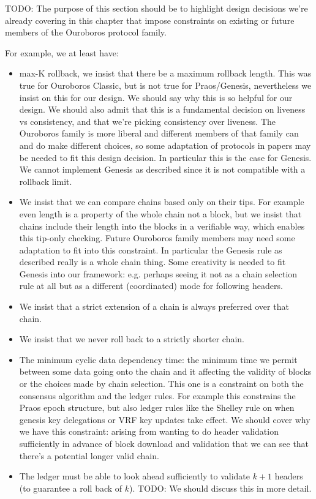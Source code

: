  TODO: The purpose of this section should be to highlight design
decisions we're already covering in this chapter that impose constraints
on existing or future members of the Ouroboros protocol family.

For example, we at least have:
\begin{itemize}
\item max-K rollback, we insist that there be a maximum rollback length. This
was true for Ouroboros Classic, but is not true for Praos/Genesis, nevertheless
we insist on this for our design. We should say why this is so helpful for our
design. We should also admit that this is a fundamental decision on liveness vs
consistency, and that we're picking consistency over liveness. The Ouroboros
family is more liberal and different members of that family can and do make
different choices, so some adaptation of protocols in papers may be needed to
fit this design decision. In particular this is the case for Genesis. We cannot
implement Genesis as described since it is not compatible with a rollback limit.

\item We insist that we can compare chains based only on their tips. For example
even length is a property of the whole chain not a block, but we insist that
chains include their length into the blocks in a verifiable way, which enables
this tip-only checking. Future Ouroboros family members may need some adaptation
to fit into this constraint. In particular the Genesis rule as described really
is a whole chain thing. Some creativity is needed to fit Genesis into our
framework: e.g. perhaps seeing it not as a chain selection rule at all but as a
different (coordinated) mode for following headers.

\item We insist that a strict extension of a chain is always preferred over
that chain.

\item We insist that we never roll back to a strictly shorter chain.

\item The minimum cyclic data dependency time: the minimum time we permit
between some data going onto the chain and it affecting the validity of blocks
or the choices made by chain selection. This one is a constraint on both the
consensus algorithm and the ledger rules. For example this constrains the Praos
epoch structure, but also ledger rules like the Shelley rule on when genesis
key delegations or VRF key updates take effect. We should cover why we have this
constraint: arising from wanting to do header validation sufficiently in advance
of block download and validation that we can see that there's a potential longer
valid chain.

\item The ledger must be able to look ahead sufficiently to validate $k + 1$
headers (to guarantee a roll back of $k$). TODO: We should discuss
this in more detail.
\end{itemize}

